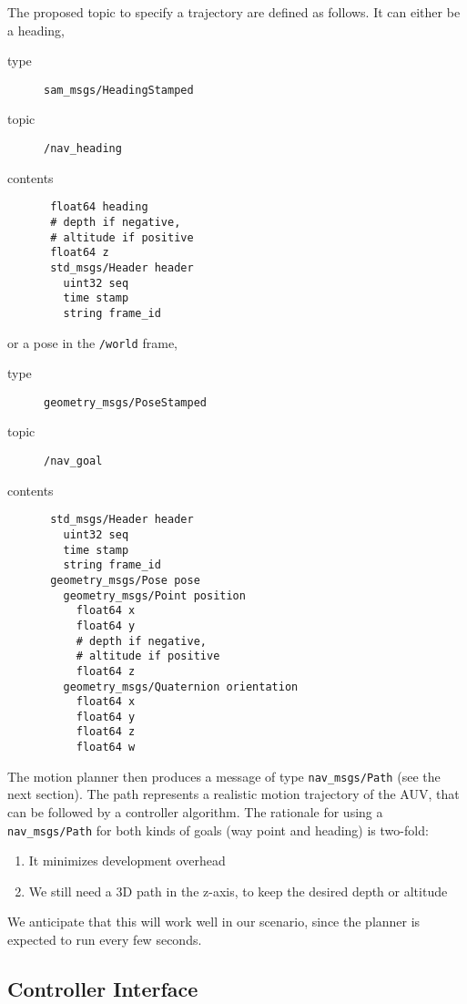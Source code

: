 \documentclass[9pt,technote]{IEEEtran} %
\begin{document}
The proposed topic to specify a trajectory are defined as follows.
It can either be a heading,
\begin{description}
\item[type] \texttt{sam\_msgs/HeadingStamped}
\item[topic] \texttt{/nav\_heading}
\item[contents] \begin{scriptsize}
\begin{verbatim}
 float64 heading
 # depth if negative,
 # altitude if positive
 float64 z
 std_msgs/Header header
   uint32 seq
   time stamp
   string frame_id
\end{verbatim}
\end{scriptsize}
\end{description}
or a pose in the \texttt{/world} frame,
\begin{description}
\item[type] \texttt{geometry\_msgs/PoseStamped}
\item[topic] \texttt{/nav\_goal}
\item[contents] \begin{scriptsize}
\begin{verbatim}
 std_msgs/Header header
   uint32 seq
   time stamp
   string frame_id
 geometry_msgs/Pose pose
   geometry_msgs/Point position
     float64 x
     float64 y
     # depth if negative,
     # altitude if positive
     float64 z 
   geometry_msgs/Quaternion orientation
     float64 x
     float64 y
     float64 z
     float64 w
\end{verbatim}
\end{scriptsize}
\end{description}
The motion planner then produces a message of type \texttt{nav\_msgs/Path}
(see the next section). The path represents a realistic motion
trajectory of the AUV, that can be followed by a controller algorithm.
The rationale for using a \texttt{nav\_msgs/Path} for both kinds
of goals (way point and heading) is two-fold:
\begin{enumerate}
\item It minimizes development overhead
\item We still need a 3D path in the z-axis, to keep the desired depth or altitude
\end{enumerate}
We anticipate that this will work well in our scenario, since
the planner is expected to run every few seconds.

\subsection{Controller Interface}
\label{controller}
\end{document}

